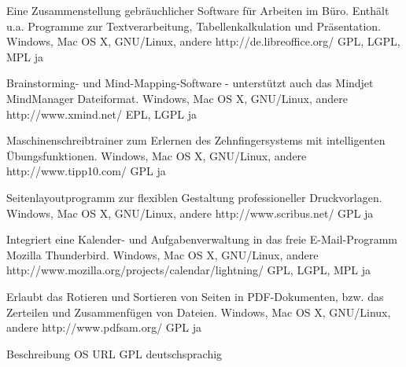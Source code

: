 \documentclass[11pt,a4paper,landscape,twocolumn]{article}
\begin{document}


{Eine Zusammenstellung gebräuchlicher Software für Arbeiten im Büro. Enthält u.a. Programme zur Textverarbeitung, Tabellenkalkulation und Präsentation.}
{Windows, Mac OS X, GNU/Linux, andere}
{http://de.libreoffice.org/}
{GPL, LGPL, MPL}
{ja}

{Brainstorming- und Mind-Mapping-Software - unterstützt auch das Mindjet MindManager Dateiformat.}
{Windows, Mac OS X, GNU/Linux, andere}
{http://www.xmind.net/}
{EPL, LGPL}
{ja}

{Maschinenschreibtrainer zum Erlernen des Zehnfingersystems mit intelligenten Übungsfunktionen.}
{Windows, Mac OS X, GNU/Linux, andere}
{http://www.tipp10.com/}
{GPL}
{ja}

{Seitenlayoutprogramm zur flexiblen Gestaltung professioneller Druckvorlagen.}
{Windows, Mac OS X, GNU/Linux, andere}
{http://www.scribus.net/}
{GPL}
{ja}


\newpage %


{Integriert eine Kalender- und Aufgabenverwaltung in das freie E-Mail-Programm Mozilla Thunderbird.}
{Windows, Mac OS X, GNU/Linux, andere}
{http://www.mozilla.org/projects/calendar/lightning/}
{GPL, LGPL, MPL}
{ja}


{Erlaubt das Rotieren und Sortieren von Seiten in PDF-Dokumenten, bzw. das Zerteilen und Zusammenfügen von Dateien.}
{Windows, Mac OS X, GNU/Linux, andere}
{http://www.pdfsam.org/}
{GPL}
{ja}


{Beschreibung}
{OS}
{URL}
{GPL}
{deutschsprachig}
\end{document}
